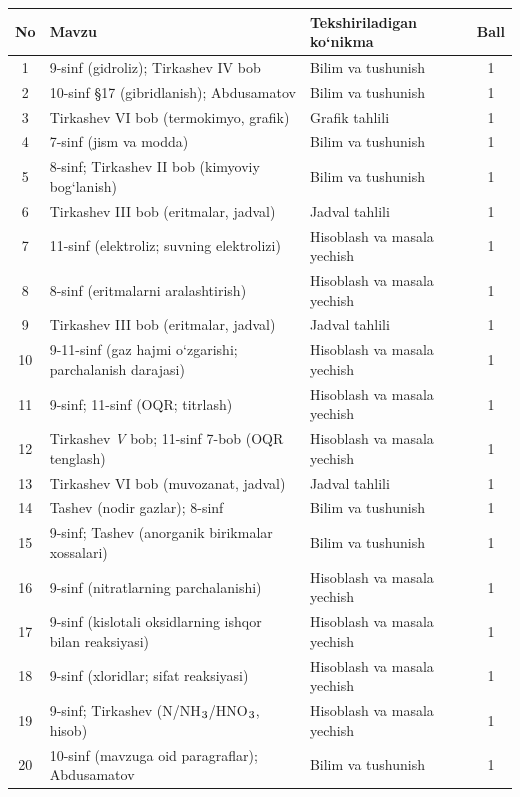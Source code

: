 \documentclass[11pt,a4paper]{article}
\renewcommand{\textsubscript}[1]{\ensuremath{_{\text{\fontsize{8}{8}\selectfont #1}}}}
\begin{document}
{\small\noindent\begin{longtable}{|c|p{7.2cm}|p{5.4cm}|c|}\hline \textbf{No} & \textbf{Mavzu} & \textbf{Tekshiriladigan ko`nikma} & \textbf{Ball}\\\hline
1 & 9-sinf (gidroliz); Tirkashev IV bob & Bilim va tushunish & 1\\\hline
2 & 10-sinf \S{}17 (gibridlanish); Abdusamatov & Bilim va tushunish & 1\\\hline
3 & Tirkashev VI bob (termokimyo, grafik) & Grafik tahlili & 1\\\hline
4 & 7-sinf (jism va modda) & Bilim va tushunish & 1\\\hline
5 & 8-sinf; Tirkashev II bob (kimyoviy bog`lanish) & Bilim va tushunish & 1\\\hline
6 & Tirkashev III bob (eritmalar, jadval) & Jadval tahlili & 1\\\hline
7 & 11-sinf (elektroliz; suvning elektrolizi) & Hisoblash va masala yechish & 1\\\hline
8 & 8-sinf (eritmalarni aralashtirish) & Hisoblash va masala yechish & 1\\\hline
9 & Tirkashev III bob (eritmalar, jadval) & Jadval tahlili & 1\\\hline
10 & 9-11-sinf (gaz hajmi o`zgarishi; parchalanish darajasi) & Hisoblash va masala yechish & 1\\\hline
11 & 9-sinf; 11-sinf (OQR; titrlash) & Hisoblash va masala yechish & 1\\\hline
12 & Tirkashev \textit{V} bob; 11-sinf 7-bob (OQR tenglash) & Hisoblash va masala yechish & 1\\\hline
13 & Tirkashev VI bob (muvozanat, jadval) & Jadval tahlili & 1\\\hline
14 & Tashev (nodir gazlar); 8-sinf & Bilim va tushunish & 1\\\hline
15 & 9-sinf; Tashev (anorganik birikmalar xossalari) & Bilim va tushunish & 1\\\hline
16 & 9-sinf (nitratlarning parchalanishi) & Hisoblash va masala yechish & 1\\\hline
17 & 9-sinf (kislotali oksidlarning ishqor bilan reaksiyasi) & Hisoblash va masala yechish & 1\\\hline
18 & 9-sinf (xloridlar; sifat reaksiyasi) & Hisoblash va masala yechish & 1\\\hline
19 & 9-sinf; Tirkashev (N/NH\textsubscript{3}/HNO\textsubscript{3}, hisob) & Hisoblash va masala yechish & 1\\\hline
20 & 10-sinf (mavzuga oid paragraflar); Abdusamatov & Bilim va tushunish & 1\\\hline

\end{longtable}}
\end{document}
